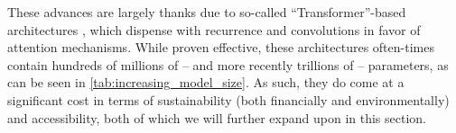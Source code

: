 These advances are largely thanks due to so-called ``Transformer''-based architectures \citep{vaswani2017attention}, which dispense with recurrence and convolutions in favor of attention mechanisms. While proven effective, these architectures often-times contain hundreds of millions of -- and more recently trillions of -- parameters, as can be seen in \cref{tab:increasing_model_size}. 
As such, they do come at a significant cost in terms of sustainability (both financially and environmentally) and accessibility, both of which we will further expand upon in this section.


